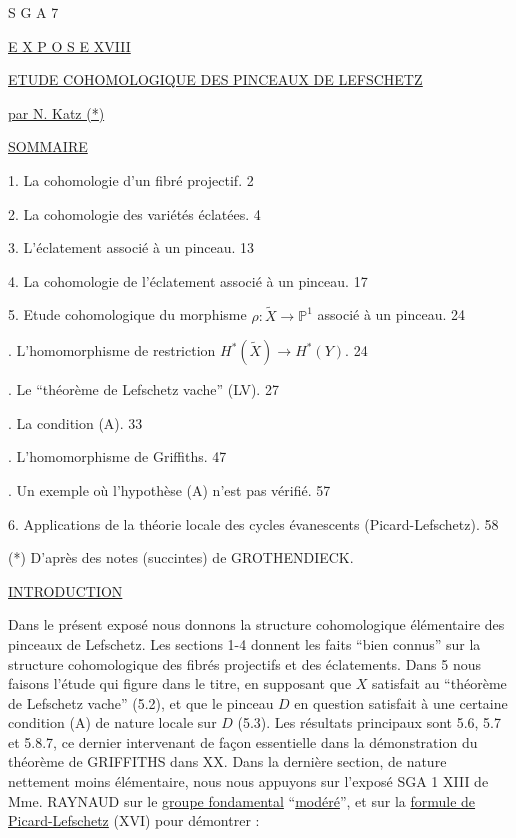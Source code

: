 


S G A 7


\underline{E X P O S E XVIII}


\underline{\underline{ETUDE COHOMOLOGIQUE DES PINCEAUX DE LEFSCHETZ}}


\underline{par N. Katz (*)}


\underline{SOMMAIRE}

1. La cohomologie d'un fibré projectif. \hfill 2

2. La cohomologie des variétés éclatées. \hfill 4

3. L'éclatement associé à un pinceau. \hfill 13

4. La cohomologie de l'éclatement associé à un pinceau. \hfill 17

5. Etude cohomologique du morphisme $\rho : \widetilde{X} \longrightarrow \mathbb{P}^{1}$ associé à un pinceau. \hfill 24

. L'homomorphisme de restriction $H^{*}(\widetilde{X}) \longrightarrow H^{*}(Y)$. \hfill 24

. Le ``théorème de Lefschetz vache'' (LV). \hfill 27

. La condition (A). \hfill 33

. L'homomorphisme de Griffiths. \hfill 47

. Un exemple où l'hypothèse (A) n'est pas vérifié. \hfill 57

6. Applications de la théorie locale des cycles évanescents (Picard-Lefschetz). \hfill 58

(*) D'après des notes (succintes) de GROTHENDIECK.




\underline{INTRODUCTION}

Dans le présent exposé nous donnons la structure cohomologique élémentaire des pinceaux de Lefschetz. Les sections 1-4 donnent les faits ``bien connus'' sur la structure cohomologique des fibrés projectifs et des éclatements. Dans 5 nous faisons l'étude qui figure dans le titre, en supposant que $X$ satisfait au ``théorème de Lefschetz vache'' (5.2), et que le pinceau $D$ en question satisfait à une certaine condition (A) de nature locale sur $D$ (5.3). Les résultats principaux sont 5.6, 5.7 et 5.8.7, ce  dernier intervenant de façon essentielle dans la démonstration du théorème de GRIFFITHS dans XX. Dans la dernière section, de nature nettement moins élémentaire, nous nous appuyons sur l'exposé SGA 1 XIII de Mme. RAYNAUD sur le \underline{groupe fondamental} ``\underline{modéré}'', et sur la \underline{formule de Picard-Lefschetz} (XVI) pour démontrer :


